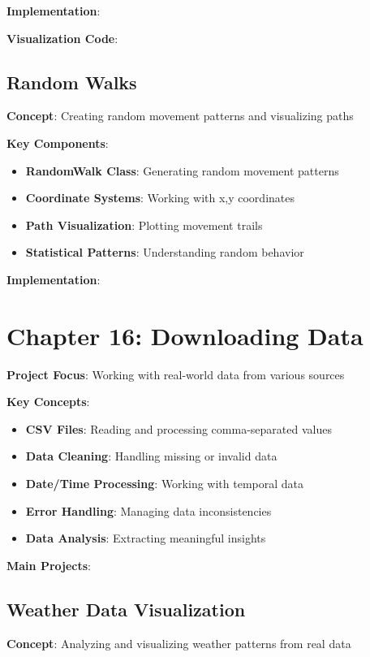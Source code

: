 \textbf{Implementation}:


\textbf{Visualization Code}:


\subsection*{Random Walks}
\textbf{Concept}: Creating random movement patterns and visualizing paths

\textbf{Key Components}:
\begin{itemize}
    \item \textbf{RandomWalk Class}: Generating random movement patterns
    \item \textbf{Coordinate Systems}: Working with x,y coordinates
    \item \textbf{Path Visualization}: Plotting movement trails
    \item \textbf{Statistical Patterns}: Understanding random behavior
\end{itemize}

\textbf{Implementation}:


\section*{Chapter 16: Downloading Data}
\textbf{Project Focus}: Working with real-world data from various sources

\textbf{Key Concepts}:
\begin{itemize}
    \item \textbf{CSV Files}: Reading and processing comma-separated values
    \item \textbf{Data Cleaning}: Handling missing or invalid data
    \item \textbf{Date/Time Processing}: Working with temporal data
    \item \textbf{Error Handling}: Managing data inconsistencies
    \item \textbf{Data Analysis}: Extracting meaningful insights
\end{itemize}

\textbf{Main Projects}:

\subsection*{Weather Data Visualization}
\textbf{Concept}: Analyzing and visualizing weather patterns from real data

